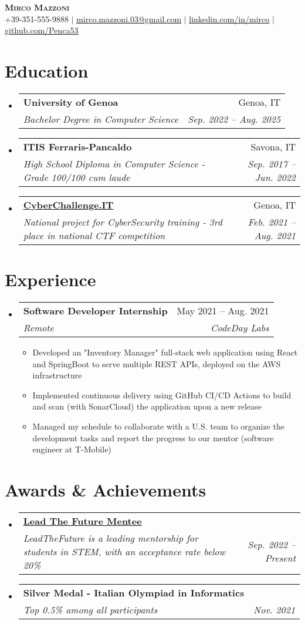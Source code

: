 \documentclass[letterpaper,11pt]{article}
\makeatletter
\newcommand{\resumeItem}[1]{
  \item\small{
    {#1 \vspace{-2pt}}
  }
}
\newcommand{\resumeSubheading}[4]{
  \vspace{-2pt}\item
    \begin{tabular*}{0.97\textwidth}[t]{l@{\extracolsep{\fill}}r}
      \textbf{#1} & #2 \\
      \textit{\small#3} & \textit{\small #4} \\
    \end{tabular*}\vspace{-7pt}
}
\newcommand{\resumeSubHeadingListStart}{\begin{itemize}[leftmargin=0.15in, label={}]}
\newcommand{\resumeSubHeadingListEnd}{\end{itemize}}
\newcommand{\resumeItemListStart}{\begin{itemize}}
\newcommand{\resumeItemListEnd}{\end{itemize}\vspace{-5pt}}
\makeatother
\begin{document}
\begin{center}
    \textbf{\Huge \scshape Mirco Mazzoni} \\ \vspace{1pt}
    \small +39-351-555-9888 $|$ \href{mailto:mirco.mazzoni.03@gmail.com}{\underline{mirco.mazzoni.03@gmail.com}} $|$ 
    \href{https://www.linkedin.com/in/mirco-mazzoni-022816219/}{\underline{linkedin.com/in/mirco}} $|$
    \href{https://github.com/Penca53}{\underline{github.com/Penca53}}
\end{center}


\section{Education}
  \resumeSubHeadingListStart
     \resumeSubheading
      {University of Genoa}{Genoa, IT}
      {Bachelor Degree in Computer Science}{Sep. 2022 -- Aug. 2025}
      \resumeSubheading
      {ITIS Ferraris-Pancaldo}{Savona, IT}
      {High School Diploma in Computer Science - Grade 100/100 cum laude}{Sep. 2017 -- Jun. 2022}
     \resumeSubheading
      {\href{https://cyberchallenge.it/halloffame/2021}{\underline{CyberChallenge.IT}}}{Genoa, IT}
      {National project for CyberSecurity training - 3rd place in national CTF competition}{Feb. 2021 -- Aug. 2021}
  \resumeSubHeadingListEnd


\section{Experience}
  \resumeSubHeadingListStart

    \resumeSubheading
      {Software Developer Internship}{May 2021 -- Aug. 2021}
      {Remote}{CodeDay Labs}
      \resumeItemListStart
        \resumeItem{Developed an "Inventory Manager" full-stack web application using React and SpringBoot to serve multiple REST APIs, deployed on the AWS infrastructure}
        \resumeItem{Implemented continuous delivery using GitHub CI/CD Actions to build and scan (with SonarCloud) the application upon a new release}
        \resumeItem{Managed my schedule to collaborate with a U.S. team to organize the development tasks and report the progress to our mentor (software engineer at T-Mobile)}
      \resumeItemListEnd
    \resumeSubHeadingListEnd

\section{Awards \& Achievements}
  \resumeSubHeadingListStart
     \resumeSubheading
      {\href{https://www.linkedin.com/company/leadthefuture/mycompany/}{\underline{Lead The Future Mentee}}}{}
      {LeadTheFuture is a leading mentorship for students in STEM, with an acceptance rate below 20\%}{Sep. 2022 -- Present}
      \resumeSubheading
      {Silver Medal - Italian Olympiad in Informatics}{}
      {Top 0.5\% among all participants}{Nov. 2021}
  \resumeSubHeadingListEnd
\end{document}
